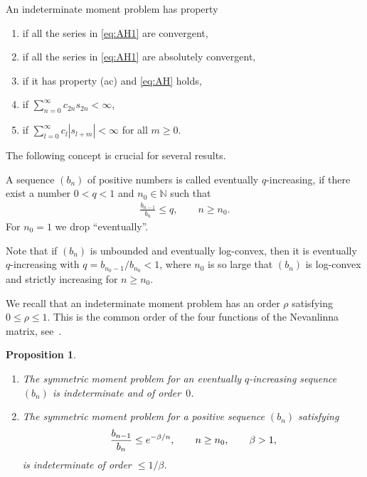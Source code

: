 \documentclass[11pt]{article}
\newcommand{\N}{\mathbb{N}}
\numberwithin{equation}{section}
\newtheorem{prop}[thm]{Proposition}
\begin{document}
\begin{defn}\label{thm:defAH} An indeterminate moment problem has property
\begin{enumerate}\itemsep=0pt
\item[{\rm (c)}] if all the series in \eqref{eq:AH1} are convergent,
\item[{\rm (ac)}] if all the series in \eqref{eq:AH1} are absolutely convergent,
\item[{\rm (aci)}] if it has property {\rm (ac)} and \eqref{eq:AH} holds,
\item[{\rm (cs)}] if $\sum\limits_{n=0}^\infty c_{2n}s_{2n}<\infty$,
\item[{\rm (cs*)}] if $\sum\limits_{l=0}^\infty c_l|s_{l+m}|<\infty$ for all $m\ge 0$.
\end{enumerate}
\end{defn}

\setcounter{section}{1}
\setcounter{subsection}{0}
\setcounter{subsubsection}{0}
\setcounter{thm}{5}
\setcounter{equation}{6}
The following concept is crucial for several results.

\begin{defn}\label{thm:defqinc} A sequence $(b_n)$ of positive numbers is called eventually $q$-increasing, if there exist a number $0<q<1$ and $n_0\in\N$ such that
\begin{gather}\label{eq:qinc}
\frac{b_{n-1}}{b_n}\le q,\qquad n\ge n_0.
\end{gather}
For $n_0=1$ we drop ``eventually''.
\end{defn}

Note that if $(b_n)$ is unbounded and eventually log-convex, then it is eventually $q$-increasing with $q=b_{n_0-1}/b_{n_0}<1$, where $n_0$ is so large that $(b_n)$ is log-convex and strictly increasing for $n \ge n_0$.

We recall that an indeterminate moment problem has an order $\rho$ satisfying $0 \le\rho\le 1$. This is the common order of the four functions of the Nevanlinna matrix, see~\cite{B:P}.

\begin{prop}\label{thm:qinc-indet}\quad
\begin{enumerate}\itemsep=0pt
\item[$(i)$] The symmetric moment problem for an eventually $q$-increasing sequence $(b_n)$ is indeterminate and of order~$0$.

\item[$(ii)$] The symmetric moment problem for a positive sequence $(b_n)$ satisfying
\begin{gather}\label{eq:betan}
\frac{b_{n-1}}{b_n}\le {\rm e}^{-\beta/n},\qquad n\ge n_0, \qquad \beta>1,
\end{gather}
is indeterminate of order $\le 1/\beta$.
\end{enumerate}
\end{prop}
\end{document}
